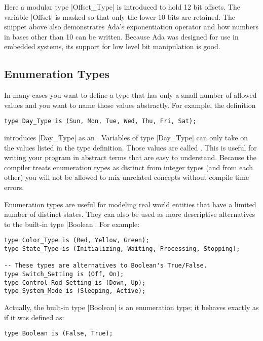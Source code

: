 \noindent Here a modular type |Offset_Type| is introduced to hold 12 bit offsets. The variable
|Offset| is masked so that only the lower 10 bits are retained. The snippet above also
demonstrates Ada's exponentiation operator and how numbers in bases other than 10 can be
written. Because Ada was designed for use in embedded systems, its support for low level bit
manipulation is good.

\subsection{Enumeration Types}

In many cases you want to define a type that has only a small number of allowed values and you
want to name those values abstractly. For example, the definition

\begin{lstlisting}
type Day_Type is (Sun, Mon, Tue, Wed, Thu, Fri, Sat);
\end{lstlisting}

\noindent introduces |Day_Type| as an . Variables of type |Day_Type|
can only take on the values listed in the type definition. Those values are called
. This is useful for writing your program in abstract terms that are easy
to understand. Because the compiler treats enumeration types as distinct from integer types (and
from each other) you will not be allowed to mix unrelated concepts without compile time errors.

Enumeration types are useful for modeling real world entities that have a limited number of
distinct states. They can also be used as more descriptive alternatives to the built-in type
|Boolean|. For example:

\begin{lstlisting}
type Color_Type is (Red, Yellow, Green);
type State_Type is (Initializing, Waiting, Processing, Stopping);

-- These types are alternatives to Boolean's True/False.
type Switch_Setting is (Off, On);
type Control_Rod_Setting is (Down, Up);
type System_Mode is (Sleeping, Active);
\end{lstlisting}

Actually, the built-in type |Boolean| is an enumeration type; it behaves exactly as if it was
defined as:

\begin{lstlisting}
type Boolean is (False, True);
\end{lstlisting}

